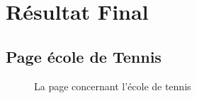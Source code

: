 \documentclass{article}[12pt]
\begin{document}
    \section{Résultat Final}
    \subsection{Page école de Tennis}
    \begin{figure}[H]
     	\centering
     	\caption{La page concernant l'école de tennis}
     \end{figure}
\end{document}
